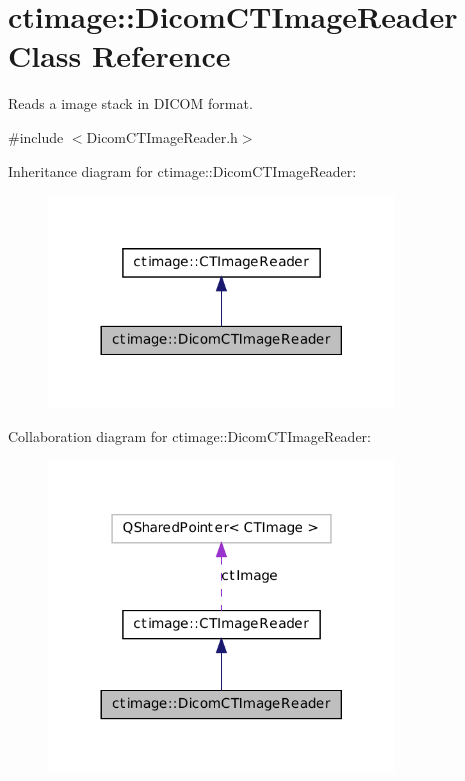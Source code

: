 \hypertarget{classctimage_1_1_dicom_c_t_image_reader}{
\section{ctimage::DicomCTImageReader Class Reference}
\label{classctimage_1_1_dicom_c_t_image_reader}
}


Reads a image stack in DICOM format.  




{\ttfamily \#include $<$DicomCTImageReader.h$>$}



Inheritance diagram for ctimage::DicomCTImageReader:\nopagebreak
\begin{figure}[H]
\begin{center}
\leavevmode
\includegraphics[width=260pt]{classctimage_1_1_dicom_c_t_image_reader__inherit__graph}
\end{center}
\end{figure}


Collaboration diagram for ctimage::DicomCTImageReader:\nopagebreak
\begin{figure}[H]
\begin{center}
\leavevmode
\includegraphics[width=260pt]{classctimage_1_1_dicom_c_t_image_reader__coll__graph}
\end{center}
\end{figure}
